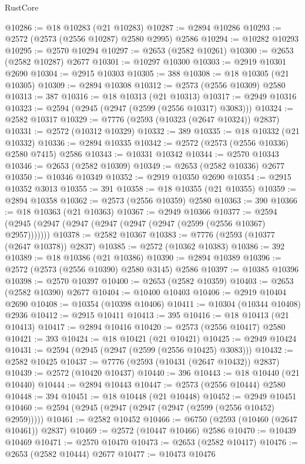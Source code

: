\begin{lexlean}{RustCore}
\begin{coremodule}
@10286 := @18 @10283 (@21 @10283)
@10287 := @2894 @10286
@10293 := @2572 (@2573 (@2556 @10287) @2580 @2995) @2586
@10294 := @10282 @10293
@10295 := @2570 @10294
@10297 := @2653 (@2582 @10261)
@10300 := @2653 (@2582 @10287) @2677
@10301 := @10297 @10300
@10303 := @2919 @10301 @2690
@10304 := @2915 @10303
@10305 := 388
@10308 := @18 @10305 (@21 @10305)
@10309 := @2894 @10308
@10312 := @2573 (@2556 @10309) @2580
@10313 := 387
@10316 := @18 @10313 (@21 @10313)
@10317 := @2949 @10316
@10323 := @2594 (@2945 (@2947 (@2599 (@2556 @10317) @3083)))
@10324 := @2582 @10317
@10329 := @7776 (@2593 (@10323 (@2647 @10324)) @2837)
@10331 := @2572 (@10312 @10329)
@10332 := 389
@10335 := @18 @10332 (@21 @10332)
@10336 := @2894 @10335
@10342 := @2572 (@2573 (@2556 @10336) @2580 @7415) @2586
@10343 := @10331 @10342
@10344 := @2570 @10343
@10346 := @2653 (@2582 @10309)
@10349 := @2653 (@2582 @10336) @2677
@10350 := @10346 @10349
@10352 := @2919 @10350 @2690
@10354 := @2915 @10352 @3013
@10355 := 391
@10358 := @18 @10355 (@21 @10355)
@10359 := @2894 @10358
@10362 := @2573 (@2556 @10359) @2580
@10363 := 390
@10366 := @18 @10363 (@21 @10363)
@10367 := @2949 @10366
@10377 := @2594 (@2945 (@2947 (@2947 (@2947 (@2947 (@2947 (@2599 (@2556 @10367) @2957)))))))
@10378 := @2582 @10367
@10383 := @7776 (@2593 (@10377 (@2647 @10378)) @2837)
@10385 := @2572 (@10362 @10383)
@10386 := 392
@10389 := @18 @10386 (@21 @10386)
@10390 := @2894 @10389
@10396 := @2572 (@2573 (@2556 @10390) @2580 @3145) @2586
@10397 := @10385 @10396
@10398 := @2570 @10397
@10400 := @2653 (@2582 @10359)
@10403 := @2653 (@2582 @10390) @2677
@10404 := @10400 @10403
@10406 := @2919 @10404 @2690
@10408 := @10354 (@10398 @10406)
@10411 := @10304 (@10344 @10408) @2936
@10412 := @2915 @10411
@10413 := 395
@10416 := @18 @10413 (@21 @10413)
@10417 := @2894 @10416
@10420 := @2573 (@2556 @10417) @2580
@10421 := 393
@10424 := @18 @10421 (@21 @10421)
@10425 := @2949 @10424
@10431 := @2594 (@2945 (@2947 (@2599 (@2556 @10425) @3083)))
@10432 := @2582 @10425
@10437 := @7776 (@2593 (@10431 (@2647 @10432)) @2837)
@10439 := @2572 (@10420 @10437)
@10440 := 396
@10443 := @18 @10440 (@21 @10440)
@10444 := @2894 @10443
@10447 := @2573 (@2556 @10444) @2580
@10448 := 394
@10451 := @18 @10448 (@21 @10448)
@10452 := @2949 @10451
@10460 := @2594 (@2945 (@2947 (@2947 (@2947 (@2599 (@2556 @10452) @2959)))))
@10461 := @2582 @10452
@10466 := @6750 (@2593 (@10460 (@2647 @10461)) @2837)
@10469 := @2572 (@10447 @10466) @2586
@10470 := @10439 @10469
@10471 := @2570 @10470
@10473 := @2653 (@2582 @10417)
@10476 := @2653 (@2582 @10444) @2677
@10477 := @10473 @10476

\end{coremodule}
\end{lexlean}

